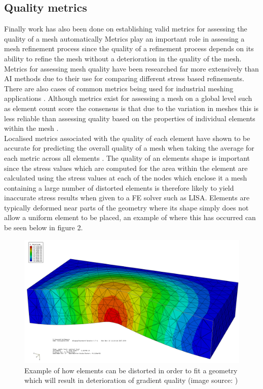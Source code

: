 \subsection{Quality metrics}
\noindent
Finally work has also been done on establishing valid metrics for assessing the quality of a mesh automatically \cite{DittmerMeshQualityMet, NeuralNetworks} Metrics play an important role in assessing a mesh refinement process since the quality of a refinement process depends on its ability to refine the mesh without a deterioration in the quality of the mesh. \\ 

\noindent
Metrics for assessing mesh quality have been researched far more extensively than AI methods due to their use for comparing different stress based refinements. There are also cases of common metrics being used for industrial meshing applications \cite{DittmerMeshQualityMet}. Although metrics exist for assessing a mesh on a global level such as element count score \cite{DittmerMeshQualityMet} the consensus is that due to the variation in meshes this is less reliable than assessing quality based on the properties of individual elements within the mesh \cite{DittmerMeshQualityMet}. \\

\noindent
Localised metrics associated with the quality of each element have shown to be accurate for predicting the overall quality of a mesh when taking the average for each metric across all elements \cite{DittmerMeshQualityMet}. The quality of an elements shape is important since the stress values which are computed for the area within the element are calculated using the stress values at each of the nodes which enclose it \cite{IntroductionToFE} a mesh containing a large number of distorted elements is therefore likely to yield inaccurate stress results when given to a FE solver such as LISA. Elements are typically deformed near parts of the geometry where its shape simply does not allow a uniform element to be placed, an example of where this has occurred can be seen below in figure 2.

\begin{figure}[H]
  \centerline{\includegraphics[width=120mm, scale=1]{../Graphics/MeshQualityDeterioration.png}}
  \caption{Example of how elements can be distorted in order to fit a geometry which will result in deterioration of gradient quality (image source: \cite{PoorFEElementShapes})}
\end{figure}

